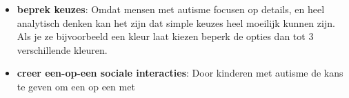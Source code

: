 \begin{itemize}
                        \item \textbf{beprek keuzes}\cite{autisme-teaching-them}:
                            Omdat mensen met autisme focusen op details, en heel analytisch denken kan het zijn dat simple keuzes heel moeilijk kunnen zijn. Als je ze bijvoorbeeld een kleur laat kiezen beperk de opties dan tot 3 verschillende kleuren.
                            
                        \item \textbf{creer een-op-een sociale interacties}\cite{autisme-teaching-them}:
                            Door kinderen met autisme de kans te geven om een op een met 

                    \end{itemize}
